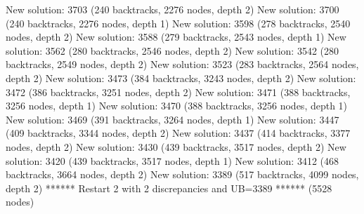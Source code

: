 \begin{enumerate}
{\begin{DoxyCode}
New solution: 3703 (240 backtracks, 2276 nodes, depth 2)
New solution: 3700 (240 backtracks, 2276 nodes, depth 1)
New solution: 3598 (278 backtracks, 2540 nodes, depth 2)
New solution: 3588 (279 backtracks, 2543 nodes, depth 1)
New solution: 3562 (280 backtracks, 2546 nodes, depth 2)
New solution: 3542 (280 backtracks, 2549 nodes, depth 2)
New solution: 3523 (283 backtracks, 2564 nodes, depth 2)
New solution: 3473 (384 backtracks, 3243 nodes, depth 2)
New solution: 3472 (386 backtracks, 3251 nodes, depth 2)
New solution: 3471 (388 backtracks, 3256 nodes, depth 1)
New solution: 3470 (388 backtracks, 3256 nodes, depth 1)
New solution: 3469 (391 backtracks, 3264 nodes, depth 1)
New solution: 3447 (409 backtracks, 3344 nodes, depth 2)
New solution: 3437 (414 backtracks, 3377 nodes, depth 2)
New solution: 3430 (439 backtracks, 3517 nodes, depth 2)
New solution: 3420 (439 backtracks, 3517 nodes, depth 1)
New solution: 3412 (468 backtracks, 3664 nodes, depth 2)
New solution: 3389 (517 backtracks, 4099 nodes, depth 2)
****** Restart 2 with 2 discrepancies and UB=3389 ****** (5528 nodes)


\end{DoxyCode}}
\end{enumerate}
